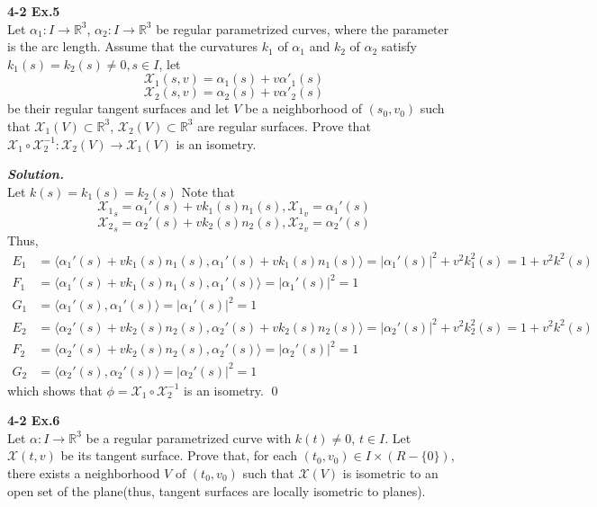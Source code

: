 \documentclass{article}
\begin{document}
\par
\textbf{4-2 Ex.5}\\
Let $\alpha_1: I \to \mathbb{R}^3$, $\alpha_2: I \to \mathbb{R}^3$
be regular parametrized curves, where the parameter is the 
arc length. Assume that the curvatures $k_1$ of $\alpha_1$
and $k_2$ of $\alpha_2$ satisfy $k_1(s) = k_2(s) \neq 0, s\in I$,
let
$$
    \mathcal{X}_1(s,v) = \alpha_1(s) + v\alpha'_1(s)
$$
$$
    \mathcal{X}_2(s,v) = \alpha_2(s) + v\alpha'_2(s)
$$
be their regular tangent surfaces and let $V$ be a neighborhood
of $(s_0, v_0)$ such that $\mathcal{X}_1(V) \subset \mathbb{R}^3$,
$\mathcal{X}_2(V) \subset \mathbb{R}^3$ are regular surfaces.
Prove that 
$\mathcal{X}_1 \circ \mathcal{X}_2^{-1}: \mathcal{X}_2(V) \to \mathcal{X}_1(V)$
is an isometry.

\par
\textbf{\textit{Solution.}}\\
Let $k(s) = k_1(s) = k_2(s)$
Note that
$$
    {\mathcal{X}_1}_s = \alpha_1'(s) + vk_1(s)n_1(s), {\mathcal{X}_1}_v = \alpha_1'(s)
$$
$$
    {\mathcal{X}_2}_s = \alpha_2'(s) + vk_2(s)n_2(s), {\mathcal{X}_2}_v = \alpha_2'(s)
$$
Thus,
$$
\begin{aligned}
    E_1 &= \langle \alpha_1'(s) + vk_1(s)n_1(s), \alpha_1'(s) + vk_1(s)n_1(s) \rangle
    = |\alpha_1'(s)|^2 + v^2k_1^2(s) 
    = 1 + v^2k^2(s)\\
    F_1 &= \langle \alpha_1'(s) + vk_1(s)n_1(s), \alpha_1'(s) \rangle
    = |\alpha_1'(s)|^2 = 1\\
    G_1 &= \langle \alpha_1'(s), \alpha_1'(s) \rangle
    = |\alpha_1'(s)|^2 = 1
\end{aligned}
$$
$$
\begin{aligned}
    E_2 &= \langle \alpha_2'(s) + vk_2(s)n_2(s), \alpha_2'(s) + vk_2(s)n_2(s) \rangle
    = |\alpha_2'(s)|^2 + v^2k_2^2(s) 
    = 1 + v^2k^2(s)\\
    F_2 &= \langle \alpha_2'(s) + vk_2(s)n_2(s), \alpha_2'(s) \rangle
    = |\alpha_2'(s)|^2 = 1\\
    G_2 &= \langle \alpha_2'(s), \alpha_2'(s) \rangle
    = |\alpha_2'(s)|^2 = 1
\end{aligned}
$$
which shows that $\phi = \mathcal{X}_1 \circ \mathcal{X}_2^{-1}$ is an isometry. \qed

\par
\textbf{4-2 Ex.6}\\
Let $\alpha: I \to \mathbb{R}^3$ be a regular parametrized curve with $k(t) \neq 0$,
$t \in I$. Let $\mathcal{X}(t,v)$ be its tangent surface. Prove that, for each
$(t_0, v_0) \in I \times (R - \{0\})$, there exists a neighborhood $V$ of $(t_0, v_0)$
such that $\mathcal{X}(V)$ is isometric to an open set of the plane(thus, tangent
surfaces are locally isometric to planes).
\end{document}
